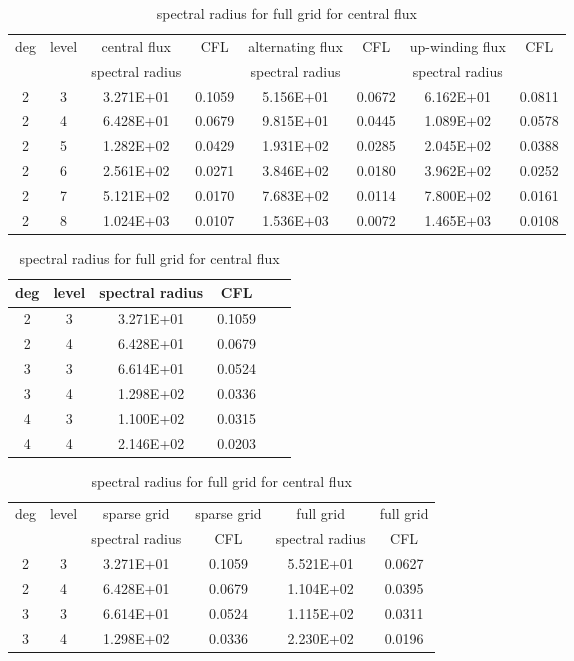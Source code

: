 \documentclass[a4paper]{article}
\begin{document}
\begin{table}[htbp]
\caption{\label{tab:test}The approximation of bounding CFL }
\centering
\vspace{5pt}
\begin{tabular}{cccccccc}
\toprule
deg &level &central flux &CFL &alternating flux &CFL &up-winding flux &CFL\\
       &        &spectral radius &         &spectral radius       &         &spectral radius        &         \\
\midrule
2 &3 &3.271E+01 &0.1059 &5.156E+01 &0.0672        &6.162E+01& 0.0811       \\
2 &4 &6.428E+01 &0.0679 &9.815E+01 &0.0445         &1.089E+02 &0.0578\\
2 &5 &1.282E+02 &0.0429 &1.931E+02 &0.0285&2.045E+02&0.0388\\
2 &6 &2.561E+02 &0.0271 &3.846E+02 &0.0180&3.962E+02&0.0252\\
2 &7 &5.121E+02 &0.0170 &7.683E+02 &0.0114&7.800E+02&0.0161\\
2 &8 &1.024E+03 &0.0107&1.536E+03 &0.0072&1.465E+03 &0.0108\\ 

\bottomrule
\end{tabular}

\caption{\label{tab:test}spectral radius for different degree for central flux}
\centering
\vspace{5pt}
\begin{tabular}{cccccc}
\toprule
deg &level &spectral radius & CFL\\
\midrule
2&3&3.271E+01&0.1059\\
2&4&6.428E+01&0.0679\\
3&3&6.614E+01&0.0524\\
3&4&1.298E+02&0.0336\\
4&3&1.100E+02&0.0315\\
4&4&2.146E+02&0.0203\\
\bottomrule
\end{tabular}

\caption{\label{tab:test}spectral radius for full grid for central flux}
\centering
\vspace{5pt}
\begin{tabular}{cccccc}
\toprule
deg &level &sparse grid&sparse grid&full grid&full grid\\
       &        &spectral radius&CFL&spectral radius&CFL\\
\midrule
2&3&3.271E+01&0.1059&5.521E+01&0.0627\\
2&4&6.428E+01&0.0679&1.104E+02&0.0395\\
3&3&6.614E+01&0.0524&1.115E+02&0.0311\\
3&4&1.298E+02&0.0336&2.230E+02&0.0196\\

\bottomrule
\end{tabular}

\end{table}
\end{document}
